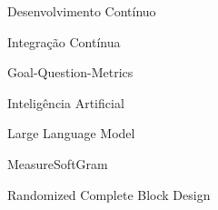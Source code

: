\begin{siglas}
  \item[CD] Desenvolvimento Contínuo
  \item[CI] Integração Contínua
  \item[GQM] Goal-Question-Metrics
  \item[IA] Inteligência Artificial
  \item[LLM] Large Language Model
  \item[MSG] MeasureSoftGram
  \item[RCBD] Randomized Complete Block Design
\end{siglas}
